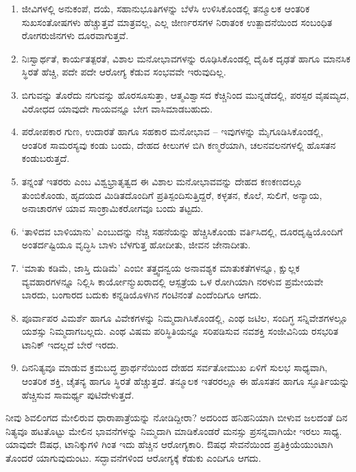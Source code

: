 \begin{enumerate}
\itemsep=1pt
\item ಜೀವಿಗಳಲ್ಲಿ ಅನುಕಂಪೆ, ದಯೆ, ಸಹಾನುಭೂತಿಗಳನ್ನು ಬೆಳೆಸಿ ಉಳಿಸಿಕೊಂಡಲ್ಲಿ ತನ್ಮೂಲಕ ಆಂತರಿಕ ಸುಖಸಂತೋಷಗಳು ಹೆಚ್ಚುತ್ತವೆ ಮಾತ್ರವಲ್ಲ, ಎಲ್ಲ ಜೀರ್ಣರಸಗಳ ನಿರಾತಂಕ ಉತ್ಪಾದನೆಯಿಂದ ಸಂಬಂಧಿತ ರೋಗರುಜಿನಗಳು ದೂರವಾಗುತ್ತವೆ.

 \item ನಿಃಸ್ವಾರ್ಥತೆ, ಕಾರ್ಯತತ್ಪರತೆ, ವಿಶಾಲ ಮನೋಭಾವಗಳನ್ನು ರೂಢಿಸಿಕೊಂಡಲ್ಲಿ ದೈಹಿಕ ದೃಢತೆ ಹಾಗೂ ಮಾನಸಿಕ ಸ್ಥಿರತೆ ಹೆಚ್ಚಿ, ಪದೇ ಪದೇ ಆರೋಗ್ಯ ಕೆಡುವ ಸಂಭವವೇ ಇರುವು\-ದಿಲ್ಲ.

 \item ಬಿಗುವನ್ನು ತೊರೆದು ನಗುವನ್ನು ಹೊರಸೂಸುತ್ತಾ, ಆತ್ಮವಿಶ್ವಾಸದ ಕೆಚ್ಚಿನಿಂದ ಮುನ್ನಡೆದಲ್ಲಿ, ಪರಸ್ಪರ ವೈಷಮ್ಯದ, ವಿರೋಧದ ಯಾವುದೇ ಗಾಯವನ್ನೂ ಬೇಗ ವಾಸಿಮಾಡಬಹುದು.

 \item ಪರೋಪಕಾರ ಗುಣ, ಉದಾರತೆ ಹಾಗೂ ಸಹಕಾರ ಮನೋಭಾವ – ಇವುಗಳನ್ನು ಮೈಗೂಡಿಸಿ\-ಕೊಂಡಲ್ಲಿ, ಆಂತರಿಕ ಸಾಮರಸ್ಯವು ಕಂಡು ಬಂದು, ದೇಹದ ಕೀಲುಗಳ ಬಿಗಿ ಕಣ್ಮರೆಯಾಗಿ, ಚಲನವಲನಗಳಲ್ಲಿ ಹೊಸತನ ಕಂಡುಬರುತ್ತದೆ.

 \item ತನ್ನಂತೆ ಇತರರು ಎಂಬ ವಿಶ್ವಭ್ರಾತೃತ್ವದ ಈ ವಿಶಾಲ ಮನೋಭಾವವನ್ನು ದೇಹದ ಕಣಕಣದಲ್ಲೂ ತುಂಬಿಕೊಂಡು, ಹೃದಯದ ಮಿಡಿತದೊಂದಿಗೆ ಪ್ರತಿಸ್ಪಂದಿಸುತ್ತಿದ್ದರೆ, ಕಳ್ಳತನ, ಕೊಲೆ, ಸುಲಿಗೆ, ಅನ್ಯಾಯ, ಅನಾಚಾರಗಳ ಯಾವ ಸಾಂಕ್ರಾಮಿಕರೋಗವೂ ಬಂದು ತಟ್ಟದು.

 \item ‘ತಾಳಿದವ ಬಾಳಿಯಾನು’ ಎಂಬುದನ್ನು ನೆಚ್ಚಿ ಸಹನೆಯನ್ನು ಹೆಚ್ಚಿಸಿಕೊಂಡು ವರ್ತಿಸಿದಲ್ಲಿ, ದೂರದೃಷ್ಟಿಯೊಂದಿಗೆ ಅಂತರ್ದಷ್ಟಿಯೂ ವೃದ್ಧಿಸಿ ಬಾಳು ಬೆಳಗುತ್ತ ಹೋದೀತು, ಜೀವನ ಜೇನಾದೀತು.

 \item ‘ಮಾತು ಕಡಿಮೆ, ಜಾಸ್ತಿ ದುಡಿಮೆ’ ಎಂಬೀ ತತ್ತ್ವದನ್ವಯ ಅನಾವಶ್ಯಕ ಮಾತುಕತೆಗಳನ್ನೂ, ಕ್ಷುಲ್ಲಕ ವ್ಯವಹಾರಗಳನ್ನೂ ನಿಲ್ಲಿಸಿ ಕಾರ್ಯೋನ್ಮುಖರಾದಲ್ಲಿ ಆಸ್ಪತ್ರೆಯ ಒಳ ರೋಗಿಯಾಗಿ ನರಳುವ ಪ್ರಮೇಯವೇ ಬಾರದು, ಬಂಗಾರದ ಬದುಕು ಕನ್ನಡಿಯೊಳಗಿನ ಗಂಟಿನಂತೆ ಎಂದೆಂದಿಗೂ ಆಗದು.

 \item ಪೂರ್ವಾಪರ ವಿಮರ್ಶೆ ಹಾಗೂ ವಿವೇಕಗಳನ್ನು ನಿಮ್ಮದಾಗಿಸಿಕೊಂಡಲ್ಲಿ, ಎಂಥ ಜಟಿಲ, ಸಂದಿಗ್ಧ ಸನ್ನಿವೇಶಗಳಲ್ಲೂ ಯಶಸ್ಸು ನಿಮ್ಮದಾಗಬಲ್ಲದು. ಎಂಥ ವಿಷಮ ಪರಿಸ್ಥಿತಿಯನ್ನೂ ಸರಿಪಡಿಸುವ ನವಶಕ್ತಿ ಸಂಜೀವಿನಿಯ ರಸಭರಿತ ಟಾನಿಕ್​ ಇದಲ್ಲದೆ ಬೇರೆ ಇರದು.

 \item ದಿನನಿತ್ಯವೂ ಮಾಡುವ ಕ್ರಮಬದ್ಧ ಪ್ರಾರ್ಥನೆಯಿಂದ ದೇಹದ ಸರ್ವತೋಮುಖ ಏಳಿಗೆ ಸುಲಭ ಸಾಧ್ಯವಾಗಿ, ಆಂತರಿಕ ಶಕ್ತಿ, ಚೈತನ್ಯ ಹಾಗೂ ಸ್ಥಿರತೆ ಹೆಚ್ಚುತ್ತದೆ. ತನ್ಮೂಲಕ ಇತರರಲ್ಲೂ ಈ ಹೊಸತನ ಹಾಗೂ ಸ್ಫೂರ್ತಿಯನ್ನು ಹೆಚ್ಚಿಸುವ ಸಾಮರ್ಥ್ಯ ಪುಟಿದೇಳುತ್ತದೆ.

\end{enumerate}

ನೀವು ಶಿವಲಿಂಗದ ಮೇಲಿರುವ ಧಾರಾಪಾತ್ರೆಯನ್ನು ನೋಡಿದ್ದೀರಾ? ಅದರಿಂದ ಹನಿಹನಿಯಾಗಿ ಬೀಳುವ ಜಲದಂತೆ ದಿನ ನಿತ್ಯವೂ ಹಟತೊಟ್ಟು ಮೇಲಿನ ಭಾವನೆಗಳನ್ನು ನಿಮ್ಮದಾಗಿ ಮಾಡಿಕೊಂಡರೆ ಮನಸ್ಸು ಪ್ರಸನ್ನವಾಗಿಯೇ ಇರಲು ಸಾಧ್ಯ. ಯಾವುದೇ ಔಷಧ, ಟಾನಿಕ್ಕುಗಳಿ ಗಿಂತ ಇದು ಹೆಚ್ಚಿನ ಆರೋಗ್ಯಕಾರಿ. ಔಷಧ ಸೇವನೆಯಿಂದ ಪ್ರತಿಕ್ರಿಯೆಯುಂಟಾಗಿ ತೊಂದರೆ ಯಾಗುವುದುಂಟು. ಸದ್ಭಾವನೆಗಳಿಂದ ಆರೋಗ್ಯಕ್ಕೆ ಕೆಡುಕು ಎಂದಿಗೂ ಆಗದು.


